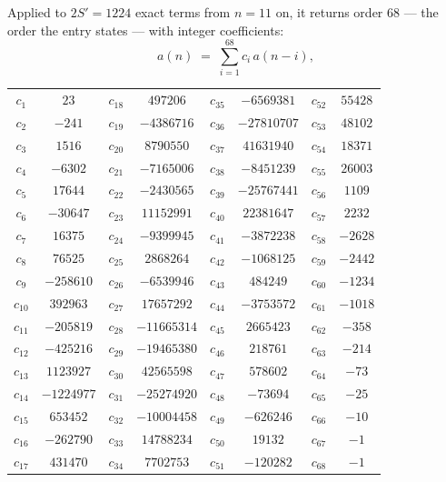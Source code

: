 \documentclass[11pt,a4paper]{article}
\theoremstyle{plain}
\theoremstyle{definition}
\begin{document}
Applied to $2S'=1224$ exact terms from $n=11$ on, it returns order $68$ --- the
order the entry states --- with integer coefficients:
\[
a(n)\;=\;\sum_{i=1}^{68}c_i\,a(n-i),
\]
\begin{center}\small
\begin{tabular}{cccccccc}
$c_{1}$ & $23$ & $c_{18}$ & $497206$ & $c_{35}$ & $-6569381$ & $c_{52}$ & $55428$ \\
$c_{2}$ & $-241$ & $c_{19}$ & $-4386716$ & $c_{36}$ & $-27810707$ & $c_{53}$ & $48102$ \\
$c_{3}$ & $1516$ & $c_{20}$ & $8790550$ & $c_{37}$ & $41631940$ & $c_{54}$ & $18371$ \\
$c_{4}$ & $-6302$ & $c_{21}$ & $-7165006$ & $c_{38}$ & $-8451239$ & $c_{55}$ & $26003$ \\
$c_{5}$ & $17644$ & $c_{22}$ & $-2430565$ & $c_{39}$ & $-25767441$ & $c_{56}$ & $1109$ \\
$c_{6}$ & $-30647$ & $c_{23}$ & $11152991$ & $c_{40}$ & $22381647$ & $c_{57}$ & $2232$ \\
$c_{7}$ & $16375$ & $c_{24}$ & $-9399945$ & $c_{41}$ & $-3872238$ & $c_{58}$ & $-2628$ \\
$c_{8}$ & $76525$ & $c_{25}$ & $2868264$ & $c_{42}$ & $-1068125$ & $c_{59}$ & $-2442$ \\
$c_{9}$ & $-258610$ & $c_{26}$ & $-6539946$ & $c_{43}$ & $484249$ & $c_{60}$ & $-1234$ \\
$c_{10}$ & $392963$ & $c_{27}$ & $17657292$ & $c_{44}$ & $-3753572$ & $c_{61}$ & $-1018$ \\
$c_{11}$ & $-205819$ & $c_{28}$ & $-11665314$ & $c_{45}$ & $2665423$ & $c_{62}$ & $-358$ \\
$c_{12}$ & $-425216$ & $c_{29}$ & $-19465380$ & $c_{46}$ & $218761$ & $c_{63}$ & $-214$ \\
$c_{13}$ & $1123927$ & $c_{30}$ & $42565598$ & $c_{47}$ & $578602$ & $c_{64}$ & $-73$ \\
$c_{14}$ & $-1224977$ & $c_{31}$ & $-25274920$ & $c_{48}$ & $-73694$ & $c_{65}$ & $-25$ \\
$c_{15}$ & $653452$ & $c_{32}$ & $-10004458$ & $c_{49}$ & $-626246$ & $c_{66}$ & $-10$ \\
$c_{16}$ & $-262790$ & $c_{33}$ & $14788234$ & $c_{50}$ & $19132$ & $c_{67}$ & $-1$ \\
$c_{17}$ & $431470$ & $c_{34}$ & $7702753$ & $c_{51}$ & $-120282$ & $c_{68}$ & $-1$ \\
\end{tabular}
\end{center}
\end{document}
